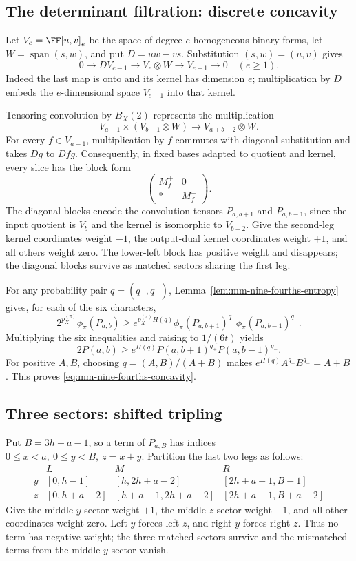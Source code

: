 \subsection{The determinant filtration: discrete concavity}

Let \(V_e=\FF[u,v]_e\) be the space of degree-\(e\) homogeneous binary forms, let \(W=\operatorname{span}(s,w)\), and put \(D=uw-vs\). Substitution \((s,w)=(u,v)\) gives
\[
 0\longrightarrow DV_{e-1}\longrightarrow V_e\otimes W
       \longrightarrow V_{e+1}\longrightarrow0
 \quad(e\geq1).
\]
Indeed the last map is onto and its kernel has dimension \(e\); multiplication by \(D\) embeds the \(e\)-dimensional space \(V_{e-1}\) into that kernel.

Tensoring convolution by \(B_X(2)\) represents the multiplication
\[
 V_{a-1}\times(V_{b-1}\otimes W)
       \longrightarrow V_{a+b-2}\otimes W.
\]
For every \(f\in V_{a-1}\), multiplication by \(f\) commutes with diagonal substitution and takes \(Dg\) to \(Dfg\). Consequently, in fixed bases adapted to quotient and kernel, every slice has the block form
\[
 \begin{pmatrix}M_f^+&0\\ *&M_f^-\end{pmatrix}.
\]
The diagonal blocks encode the convolution tensors \(P_{a,b+1}\) and \(P_{a,b-1}\), since the input quotient is \(V_b\) and the kernel is isomorphic to \(V_{b-2}\). Give the second-leg kernel coordinates weight \(-1\), the output-dual kernel coordinates weight \(+1\), and all others weight zero. The lower-left block has positive weight and disappears; the diagonal blocks survive as matched sectors sharing the first leg.

For any probability pair \(q=(q_+,q_-)\), Lemma~\ref{lem:mm-nine-fourths-entropy} gives, for each of the six characters,
\[
 2^{p_X^{(\pi)}}\phi_\pi(P_{a,b})\geq
 e^{p_X^{(\pi)}H(q)}
 \phi_\pi(P_{a,b+1})^{q_+}\phi_\pi(P_{a,b-1})^{q_-}.
\]
Multiplying the six inequalities and raising to \(1/(6t)\) yields
\[
 2P(a,b)\geq e^{H(q)}P(a,b+1)^{q_+}P(a,b-1)^{q_-}.
\]
For positive \(A,B\), choosing \(q=(A,B)/(A+B)\) makes \(e^{H(q)}A^{q_+}B^{q_-}=A+B\). This proves \eqref{eq:mm-nine-fourths-concavity}.

\subsection{Three sectors: shifted tripling}

Put \(B=3h+a-1\), so a term of \(P_{a,B}\) has indices \(0\leq x<a,\ 0\leq y<B,\ z=x+y\). Partition the last two legs as follows:
\[
\begin{array}{c|ccc}
 &L&M&R\\\hline
 y &[0,h-1]&[h,2h+a-2]&[2h+a-1,B-1]\\
 z &[0,h+a-2]&[h+a-1,2h+a-2]&[2h+a-1,B+a-2]
\end{array}
\]
Give the middle \(y\)-sector weight \(+1\), the middle \(z\)-sector weight \(-1\), and all other coordinates weight zero. Left \(y\) forces left \(z\), and right \(y\) forces right \(z\). Thus no term has negative weight; the three matched sectors survive and the mismatched terms from the middle \(y\)-sector vanish.

